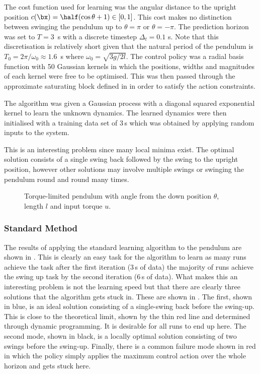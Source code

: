 The cost function used for learning was the angular distance to the upright position $c(\bx) = \half(\cos\theta+1) \in [0,1]$. This cost makes no distinction between swinging the pendulum up to $\theta=\pi$ or $\theta=-\pi$. The prediction horizon was set to $T = 3\!$~s with a discrete timestep $\Delta_t = 0.1\!$ s. Note that this discretisation is relatively short given that the natural period of the pendulum is $T_0 = 2\pi/\omega_0 \approx 1.6\!$~s where $\omega_0 = \sqrt{3g/2l}$.
The control policy was a radial basis function with 50 Gaussian kernels in which the positions, widths and magnitudes of each kernel were free to be optimised. This was then passed through the approximate saturating block defined in  in order to satisfy the action constraints. 

The algorithm was given a Gaussian process with a diagonal squared exponential kernel to learn the unknown dynamics. The learned dynamics were then initialised with a training data set of 3$\,$s which was obtained by applying random inputs to the system.

This is an interesting problem since many local minima exist. The optimal solution consists of a single swing back followed by the swing to the upright position, however other solutions may involve multiple swings or swinging the pendulum round and round many times.

\begin{figure}[t]
\centering

\caption{Torque-limited pendulum with angle from the down position $\theta$, length $l$ and input torque $u$.}
\label{fig:pendulum}
\end{figure}



\subsubsection{Standard Method}
The results of applying the standard learning algorithm to the pendulum are shown in . This is clearly an easy task for the algorithm to learn as many runs achieve the task after the first iteration (3$\,$s of data) the majority of runs achieve the swing up task by the second iteration (6$\,$s of data). What makes this an interesting problem is not the learning speed but that there are clearly three solutions that the algorithm gets stuck in. These are shown in . The first, shown in blue, is an ideal solution consisting of a single-swing back before the swing-up. This is close to the theoretical limit, shown by the thin red line and determined through dynamic programming. It is desirable for all runs to end up here. The second mode, shown in black, is a locally optimal solution consisting of two swings before the swing-up. Finally, there is a common failure mode shown in red in which the policy simply applies the maximum control action over the whole horizon and gets stuck here.


